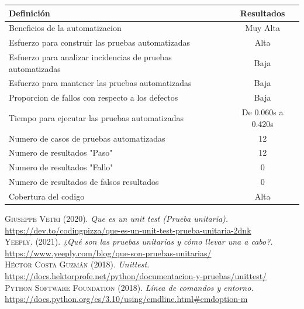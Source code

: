 \documentclass[conference]{IEEEtran}
\begin{document}
\begin{tabular}{|l|c|}
\hline 
Definición & Resultados \\ 
\hline 
Beneficios de la automatizacion & Muy Alta \\ 
\hline 
Esfuerzo para construir las pruebas automatizadas & Alta \\ 
\hline 
Esfuerzo para analizar incidencias de pruebas automatizadas & Baja \\ 
\hline 
Esfuerzo para  mantener las pruebas automatizadas & Baja \\ 
\hline 
Proporcion de fallos con respecto a los defectos & Baja \\ 
\hline 
Tiempo para ejecutar las pruebas automatizadas & De 0.060s a 0.420s \\ 
\hline 
Numero de casos de pruebas automatizadas & 12 \\ 
\hline 
Numero de resultados "Paso" & 12 \\ 
\hline 
Numero de resultados "Fallo" & 0 \\ 
\hline 
Numero de resultados de falsos resultados & 0 \\ 
\hline 
Cobertura del codigo & Alta \\ 
\hline 
\end{tabular} 









\normalsize

\begin{thebibliography}{}


 \textsc{Giuseppe Vetri} (2020). \textit{Que es un unit test (Prueba unitaria).} \url{https://dev.to/codingpizza/que-es-un-unit-test-prueba-unitaria-2dnk}\\

 \textsc{Yeeply.} (2021). \textit{¿Qué son las pruebas unitarias y cómo llevar una a cabo?.} \url{https://www.yeeply.com/blog/que-son-pruebas-unitarias/} \\

 \textsc{Héctor Costa Guzmán} (2018). \textit{Unittest.} \url{https://docs.hektorprofe.net/python/documentacion-y-pruebas/unittest/} \\

 \textsc{Python Software Foundation} (2018). \textit{Línea de comandos y entorno.} \url{https://docs.python.org/es/3.10/using/cmdline.html#cmdoption-m} \\



\end{thebibliography}
\end{document}
